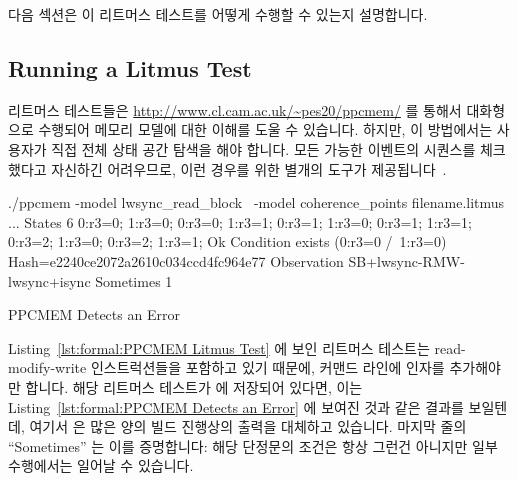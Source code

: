 다음 섹션은 이 리트머스 테스트를 어떻게 수행할 수 있는지 설명합니다.
\iffalse

Putting all this together, the C-language equivalent to the entire litmus
test is as shown in
Listing~\ref{lst:formal:Meaning of PPCMEM Litmus Test}.
The key point is that if \co{atomic_add_return()} acts as a full
memory barrier (as the Linux kernel requires it to), 
then it should be impossible for \co{P0()}'s and \co{P1()}'s \co{r3}
variables to both be zero after execution completes.

The next section describes how to run this litmus test.
\fi

\subsection{Running a Litmus Test}
\label{sec:formal:Running a Litmus Test}

리트머스 테스트들은
\url{http://www.cl.cam.ac.uk/~pes20/ppcmem/} 를 통해서 대화형으로 수행되어
메모리 모델에 대한 이해를 도울 수 있습니다.
하지만, 이 방법에서는 사용자가 직접 전체 상태 공간 탐색을 해야 합니다.
모든 가능한 이벤트의 시퀀스를 체크했다고 자신하긴 어려우므로, 이런 경우를
위한 별개의 도구가 제공됩니다~\cite{PaulEMcKenney2011ppcmem}.
\iffalse

Litmus tests may be run interactively via
\url{http://www.cl.cam.ac.uk/~pes20/ppcmem/}, which can help build an
understanding of the memory model.
However, this approach requires that the user manually carry out the
full state-space search.
Because it is very difficult to be sure that you have checked every
possible sequence of events, a separate tool is provided for this
purpose~\cite{PaulEMcKenney2011ppcmem}.
\fi

\begin{listing}[tbp]
{ \scriptsize
\begin{verbbox}
./ppcmem -model lwsync_read_block \
         -model coherence_points filename.litmus
...
States 6
0:r3=0; 1:r3=0;
0:r3=0; 1:r3=1;
0:r3=1; 1:r3=0;
0:r3=1; 1:r3=1;
0:r3=2; 1:r3=0;
0:r3=2; 1:r3=1;
Ok
Condition exists (0:r3=0 /\ 1:r3=0)
Hash=e2240ce2072a2610c034ccd4fc964e77
Observation SB+lwsync-RMW-lwsync+isync Sometimes 1
\end{verbbox}
}
\centering
\theverbbox
\caption{PPCMEM Detects an Error}
\label{lst:formal:PPCMEM Detects an Error}
\end{listing}

Listing~\ref{lst:formal:PPCMEM Litmus Test}
에 보인 리트머스 테스트는 read-modify-write 인스트럭션들을 포함하고 있기
때문에, 커맨드 라인에  인자를 추가해야만 합니다.
해당 리트머스 테스트가  에 저장되어 있다면, 이는
Listing~\ref{lst:formal:PPCMEM Detects an Error} 에 보여진 것과 같은 결과를
보일텐데, 여기서 \co{...} 은 많은 양의 빌드 진행상의 출력을 대체하고 있습니다.
마지막 줄의 ``Sometimes'' 는 이를 증명합니다: 해당 단정문의 조건은 항상 그런건
아니지만 일부 수행에서는 일어날 수 있습니다.
\iffalse

